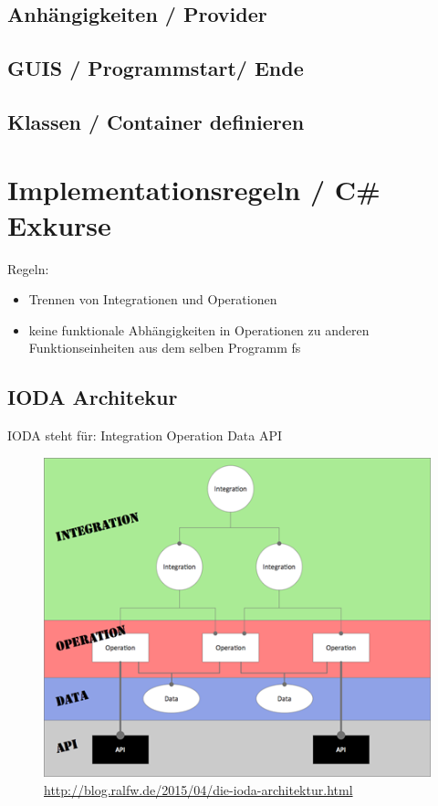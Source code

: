 \documentclass[11pt]{article}
\begin{document}
\subsection{Anhängigkeiten / Provider}
\label{sec:orgheadline15}
\subsection{GUIS / Programmstart/ Ende}
\label{sec:orgheadline16}
\subsection{Klassen / Container definieren}
\label{sec:orgheadline17}

\section{Implementationsregeln / C\# Exkurse}
\label{sec:orgheadline44}

Regeln:
\begin{itemize}
\item Trennen von Integrationen und Operationen
\item keine funktionale Abhängigkeiten in Operationen zu anderen Funktionseinheiten aus dem selben Programm
fs
\end{itemize}
\subsection{IODA Architekur}
\label{sec:orgheadline25}
IODA steht für: Integration Operation Data API
\begin{figure}[htb]
\centering
\includegraphics[width=.9\linewidth]{./img/ioda1.png}
\caption{\url{http://blog.ralfw.de/2015/04/die-ioda-architektur.html}}
\end{figure}
\end{document}

